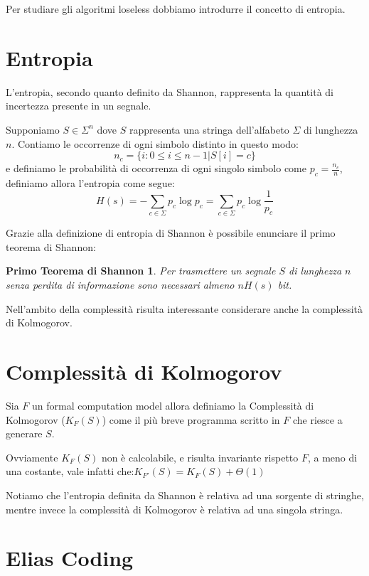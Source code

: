 \documentclass[a4paper,11pt]{book}
\begin{document}
Per studiare gli algoritmi loseless dobbiamo introdurre il concetto di entropia.

\section{Entropia}

L'entropia, secondo quanto definito da Shannon, rappresenta la quantit\`a di incertezza presente in un segnale.

Supponiamo $ S \in \Sigma^n $ dove $S$ rappresenta una stringa dell'alfabeto $\Sigma$ di lunghezza $n$. Contiamo le occorrenze di ogni simbolo distinto in questo modo: $$ n_c = \{i : 0 \leq i \leq n-1  |  S[i] = c\}$$ e definiamo le probabilit\`a di occorrenza di ogni singolo simbolo come $ p_c = \frac{n_c}{n}$, definiamo allora l'entropia come segue: $$ H(s) = - \sum_{c \in \Sigma} p_c \log p_c = \sum_{c \in \Sigma} p_c \log \frac{1}{p_c}$$

Grazie alla definizione di entropia di Shannon \`e possibile enunciare il primo teorema di Shannon:

\newtheorem{shan1}{Primo Teorema di Shannon}
\begin{shan1}
Per trasmettere un segnale $S$ di lunghezza $n$ senza perdita di informazione sono necessari almeno $nH(s)$ bit.
\end{shan1}

Nell'ambito della complessit\`a risulta interessante considerare anche la complessit\`a di Kolmogorov.

\section{Complessit\`a di Kolmogorov}

Sia $F$ un formal computation model allora definiamo la Complessit\`a di Kolmogorov ($K_{F}(S)$) come il pi\`u breve programma scritto in $F$ che riesce a generare $S$.

Ovviamente $K_{F}(S)$ non \`e calcolabile, e risulta invariante rispetto $F$, a meno di una costante, vale infatti che:$K_{F'}(S) = K_{F}(S) + \Theta(1)$

Notiamo che l'entropia definita da Shannon \`e relativa ad una sorgente di stringhe, mentre invece la complessit\`a di Kolmogorov \`e relativa ad una singola stringa.

\section{Elias Coding}
\end{document}
